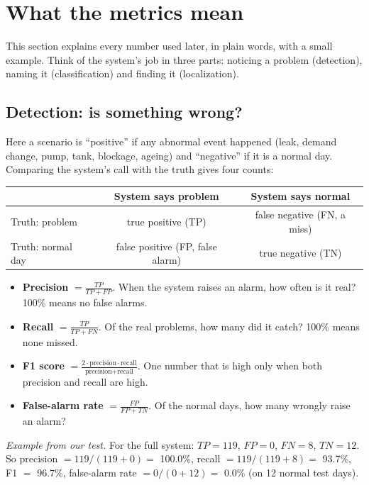 \documentclass[11pt,a4paper]{article}
\begin{document}
\section{What the metrics mean}
This section explains every number used later, in plain words, with a small example. Think of the system's job in three parts: noticing a problem (detection), naming it (classification) and finding it (localization).

\subsection{Detection: is something wrong?}
Here a scenario is ``positive'' if any abnormal event happened (leak, demand change, pump, tank, blockage, ageing) and ``negative'' if it is a normal day. Comparing the system's call with the truth gives four counts:
\begin{center}\small\begin{tabular}{@{}lcc@{}}\toprule
 & System says problem & System says normal \\\midrule
Truth: problem & true positive (TP) & false negative (FN, a miss) \\
Truth: normal day & false positive (FP, false alarm) & true negative (TN) \\\bottomrule\end{tabular}\end{center}
\begin{itemize}[itemsep=3pt]
\item \textbf{Precision} $=\frac{TP}{TP+FP}$. When the system raises an alarm, how often is it real? 100\% means no false alarms.
\item \textbf{Recall} $=\frac{TP}{TP+FN}$. Of the real problems, how many did it catch? 100\% means none missed.
\item \textbf{F1 score} $=\frac{2\cdot\text{precision}\cdot\text{recall}}{\text{precision}+\text{recall}}$. One number that is high only when both precision and recall are high.
\item \textbf{False-alarm rate} $=\frac{FP}{FP+TN}$. Of the normal days, how many wrongly raise an alarm?
\end{itemize}
\textit{Example from our test.} For the full system: $TP=119$, $FP=0$, $FN=8$, $TN=12$. So precision $=119/(119+0)=$ 100.0\%, recall $=119/(119+8)=$ 93.7\%, F1 $=$ 96.7\%, false-alarm rate $=0/(0+12)=$ 0.0\% (on 12 normal test days).
\end{document}
